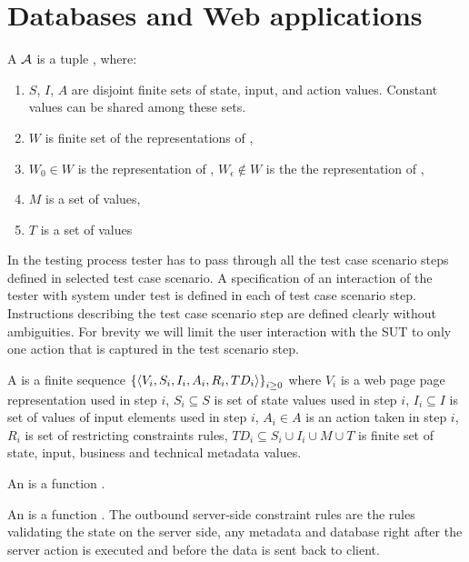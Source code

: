 \chapter{Databases and Web applications}
\begin{defi}
A  $\mathcal{A}$ is a tuple , where:
\begin{enumerate}
\item $S$, $I$, $A$ are disjoint finite sets of state, input, and action values. Constant values can be shared among these sets.
\item $W$ is finite set of the representations of ,
\item $W_0\in W$ is the representation of , $W_{\epsilon}\notin W$ is the the representation of ,
\item $M$ is a set of  values,
\item $T$ is a set of  values
\end{enumerate}
In the testing process tester has to pass through all the test case scenario steps defined in selected test case scenario. A specification of an interaction of the tester with system under test is defined in each of test case scenario step. Instructions describing the test case scenario step are defined clearly without ambiguities. For brevity we will limit the user interaction with the SUT to only one action that is captured in the test scenario step.
\cite{conf/fedcsis/FrajtakBJ12}
\end{defi}

\begin{defi}
A  is a finite sequence $\left\{ \left\langle V_i,S_i,I_i,A_i,R_i,TD_i\right\rangle\right\}_{i\geq 0}$ where $V_i$ is a web page page representation used in step $i$, $S_i\subseteq S$ is set of state values used in step $i$, $I_i\subseteq I$ is set of values of input elements used in step $i$, $A_i\in A$ is an action taken in step $i$, $R_i$ is set of restricting constraints rules, $TD_i\subseteq S_i\cup I_i\cup M\cup T$ is finite set of state, input, business and technical metadata values.
\cite{conf/fedcsis/FrajtakBJ12}
\end{defi}

\begin{defi}
An  is a function .
\cite{conf/fedcsis/FrajtakBJ12}
\end{defi}

\begin{defi}
An  is a function . The outbound server-side constraint rules are the rules validating the state on the server side, any metadata and database right after the server action is executed and before the data is sent back to client.
\cite{conf/fedcsis/FrajtakBJ12}
\end{defi}